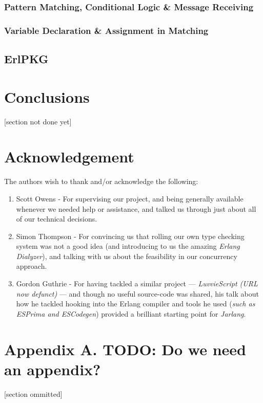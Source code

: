 \documentclass[twoside,12pt,titlepage,a4paper]{article}
\begin{document}
	
\subsubsection{Pattern Matching, Conditional Logic \& Message Receiving}
\subsubsection{Variable Declaration \& Assignment in Matching}
\subsection{ErlPKG}

\section{Conclusions}
\label{Conclusions}

 [section not done yet]

\section{Acknowledgement}
	The authors wish to thank and/or acknowledge the following:
	\begin{enumerate}
		\item Scott Owens - For supervising our project, and being generally available whenever we needed help or assistance, and talked us through just about all of our technical decisions.
		\item Simon Thompson - For convincing us that rolling our own type checking system was not a good idea (and introducing to us the amazing \textit{Erlang Dialyzer}), and talking with us about the feasibility in our concurrency approach.
		\item Gordon Guthrie - For having tackled a similar project --- \textit{LuvvieScript (URL now defunct)} --- and though no useful source-code was shared, his talk about how he tackled hooking into the Erlang compiler and tools he used (\textit{such as ESPrima and ESCodegen}) provided a brilliant starting point for \textit{Jarlang}.
	\end{enumerate}
\appendix
\section*{Appendix A. TODO: Do we need an appendix?}


[section ommitted]



\vskip 0.2in


\end{document}

